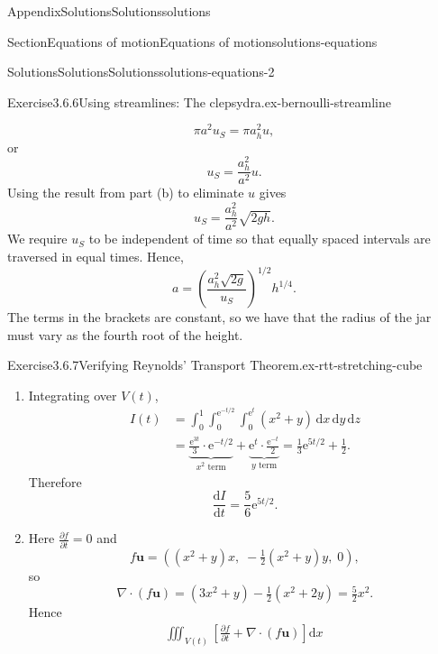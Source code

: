 \documentclass[oneside,10pt,]{book}
\numberwithin{equation}{section}
\newcommand{\e}{\mathrm{e}}
\newcommand{\de}{\mathrm{d}}
\newcommand{\dd}[2]{\frac{\de#1}{\de#2}}
\newcommand{\pd}[2]{\frac{\partial#1}{\partial#2}}
\newcommand{\bu}{\boldsymbol{u}}
\begin{document}
\begin{appendixptx}{Appendix}{Solutions}{}{Solutions}{}{}{solutions}
\begin{sectionptx}{Section}{Equations of motion}{}{Equations of motion}{}{}{solutions-equations}
\begin{solutions-subsection-numberless}{Solutions}{Solutions}{}{Solutions}{}{}{solutions-equations-2}
\begin{divisionsolution}{Exercise}{3.6.6}{Using streamlines: The clepsydra.}{ex-bernoulli-streamline}
\begin{enumerate}[font=\bfseries,label=(\alph*),ref=\alph*]
\begin{equation*}
\pi a^2 u_S = \pi a_h^2 u,
\end{equation*}
or%
\begin{equation*}
u_S = \frac{a_h^2}{a^2}u.
\end{equation*}
Using the result from part (b) to eliminate \(u\) gives%
\begin{equation*}
u_S = \frac{a_h^2}{a^2}\sqrt{2gh}.
\end{equation*}
We require \(u_S\) to be independent of time so that equally spaced intervals are traversed in equal times. Hence,%
\begin{equation*}
a=\left(\frac{a_h^2\sqrt{2g}}{u_S}\right)^{1/2} h^{1/4}.
\end{equation*}
The terms in the brackets are constant, so we have that the radius of the jar must vary as the fourth root of the height.%
\end{enumerate}%
\end{divisionsolution}%
\begin{divisionsolution}{Exercise}{3.6.7}{Verifying Reynolds' Transport Theorem.}{ex-rtt-stretching-cube}%
\begin{enumerate}[font=\bfseries,label=(\alph*),ref=\alph*]%
\item[(a)]\noindent\hypertarget{ex-rtt-stretching-cube-3-2-main}{}Integrating over \(V(t)\),%
\begin{align*}
I(t) &= \int_0^1 \int_0^{\e^{-t/2}} \int_0^{\e^{t}} (x^2 + y) \, \de{x}
\, \de{y} \, \de{z}\\
&= \underbrace{\frac{\e^{3t}}{3} \cdot \e^{-t/2}}_{x^2 \text{ term}}
+ \underbrace{\e^{t} \cdot \frac{\e^{-t}}{2}}_{y \text{ term}}
= \frac13 \e^{5t/2} + \frac12.
\end{align*}
Therefore%
\begin{equation*}
\dd{I}{t} = \frac56 \e^{5t/2}.
\end{equation*}
%
\item[(b)]\noindent\hypertarget{ex-rtt-stretching-cube-4-2-main}{}Here \(\pd{f}{t} = 0\) and%
\begin{equation*}
f\bu = \left( (x^2 + y)x, \; -\tfrac12 (x^2 + y)y, \; 0 \right),
\end{equation*}
so%
\begin{equation*}
\nabla \cdot (f\bu) = (3x^2 + y) - \tfrac12 (x^2 + 2y) = \tfrac52 x^2.
\end{equation*}
Hence%
\begin{align*}
\iiint_{V(t)} \left[ \pd{f}{t} + \nabla \cdot (f\bu) \right] \de{x} \,

\end{align*}
\end{enumerate}
\end{divisionsolution}
\end{solutions-subsection-numberless}
\end{sectionptx}
\end{appendixptx}
\end{document}
